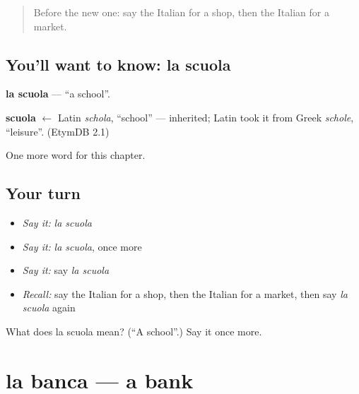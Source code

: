 \label{lesson:IT-C81-scuola}



\begin{quote}
Before the new one: say the Italian for a shop, then the Italian for a market.
\end{quote}

\subsection*{You'll want to know: la scuola}
\textbf{la scuola} — \textquotedblleft{}a school\textquotedblright{}.

\begin{cousinweb}
\textbf{scuola} $\leftarrow$ Latin \emph{schola}, \textquotedblleft{}school\textquotedblright{} — inherited; Latin took it from Greek \emph{schole}, \textquotedblleft{}leisure\textquotedblright{}. (EtymDB 2.1)
\end{cousinweb}

\begin{grammarlens}[title={What you've built}]
One more word for this chapter.
\end{grammarlens}

\subsection*{Your turn}
\begin{itemize}
\raggedright
  \item \emph{Say it:} \emph{la scuola}
  \item \emph{Say it:} \emph{la scuola}, once more
  \item \emph{Say it:} say \emph{la scuola}
  \item \emph{Recall:} say the Italian for a shop, then the Italian for a market, then say \emph{la scuola} again
\end{itemize}

\begin{tcolorbox}[breakable,colback=teal!4,colframe=teal!35!black,title={Before you move on}]
What does la scuola mean? (\textquotedblleft{}A school\textquotedblright{}.) Say it once more.
\end{tcolorbox}
\section[la banca]{la banca — a bank}

\label{lesson:IT-C81-banca}



